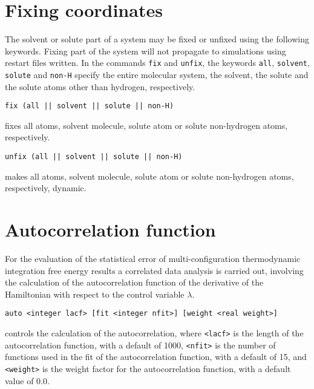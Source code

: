 \section{Fixing coordinates}
The solvent or solute part of a system may be fixed or unfixed using
the following keywords. Fixing part of the system will not propagate to
simulations using restart files written. In the commands \verb+fix+
and \verb+unfix+, the keywords \verb+all+, \verb+solvent+,
\verb+solute+ and \verb+non-H+ specify the entire molecular system,
the solvent, the solute and the solute atoms other than hydrogen,
respectively.
\begin{description}
\item
\begin{verbatim}
fix (all || solvent || solute || non-H)
\end{verbatim}
fixes all atoms, solvent molecule, solute atom or solute non-hydrogen atoms,
respectively.
\item
\begin{verbatim}
unfix (all || solvent || solute || non-H)
\end{verbatim}
makes all atoms, solvent molecule, solute atom or solute non-hydrogen atoms,
respectively, dynamic.
\end{description}

\section{Autocorrelation function}
For the evaluation of the statistical error of multi-configuration
thermodynamic integration free energy results a correlated data 
analysis is carried out, involving the calculation of the
autocorrelation function of the derivative of the Hamiltonian with
respect to the control variable $\lambda$.
\begin{description}

\item 
\begin{verbatim}
auto <integer lacf> [fit <integer nfit>] [weight <real weight>]
\end{verbatim}
controls the calculation of the autocorrelation,
where \verb+<lacf>+ is the length of the autocorrelation function, with
a default of 1000, \verb+<nfit>+ is the number of functions used in the
fit of the autocorrelation function, with a default of 15, and
\verb+<weight>+ is the weight factor for the autocorrelation function,
with a default value of 0.0.
\end{description}

